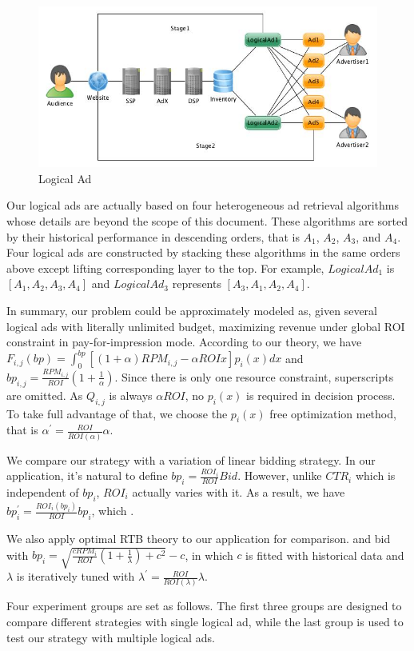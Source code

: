 \documentclass[sigconf]{acmart}
\newcommand{\sbp}{bp_{i,j}}
\newcommand{\sRPM}{RPM_{i,j}}
\newcommand{\sF}{F_{i,j}}
\newcommand{\ortbbp}{\sqrt{\frac{cRPM_i}{ROI}(1+\frac{1}{\lambda})+c^2}-c}
\newcommand{\dbbp}{\frac{\sRPM}{ROI}(1+\frac{1}{\alpha})}
\newcommand{\liniter}{bp_i^{'}=\frac{ROI_i(bp_i)}{ROI}bp_i}
\newcommand{\ortbiter}{\lambda^{'}=\frac{ROI}{ROI(\lambda)}\lambda}
\newcommand{\dbiter}{\alpha^{'} = \frac{ROI}{ROI(\alpha)}\alpha}
\begin{document}
\begin{figure}[!h]
\centering
\includegraphics[width=0.6\linewidth]{./LogicalAd.jpg}
\caption{Logical Ad}
\end{figure}

Our logical ads are actually based on four heterogeneous ad retrieval algorithms whose details are beyond the scope of this document.
These algorithms are sorted by their historical performance in descending orders, that is $A_1$, $A_2$, $A_3$, and $A_4$.
Four logical ads are constructed by stacking these algorithms in the same orders above except lifting corresponding layer to the top.
For example, $LogicalAd_1$ is $[A_1, A_2, A_3, A_4]$ and $LogicalAd_3$ represents $[A_3, A_1, A_2, A_4]$.

In summary, our problem could be approximately modeled as, given several logical ads with literally unlimited budget,
    maximizing revenue under global ROI constraint in pay-for-impression mode.
According to our theory, we have $\sF(bp) = \int_0^{bp} [(1+\alpha)\sRPM - \alpha{}ROIx]p_i(x)dx$
    and $\sbp=\dbbp$.
Since there is only one resource constraint, superscripts are omitted.
As $Q_{i,j}$ is always $\alpha{}ROI$, no $p_i(x)$ is required in decision process.
To take full advantage of that, we choose the $p_i(x)$ free optimization method,
    that is $\dbiter$.

We compare our strategy with a variation of linear bidding strategy.
In our application, it's natural to define $bp_i=\frac{ROI_i}{ROI}Bid$.
However, unlike $CTR_i$ which is independent of $bp_i$, $ROI_i$ actually varies with it.
As a result, we have $\liniter$,
    which .

We also apply optimal RTB theory to our application for comparison.
    and bid with $bp_i=\ortbbp$,
    in which $c$ is fitted with historical data
    and $\lambda$ is iteratively tuned with $\ortbiter$.

Four experiment groups are set as follows.
The first three groups are designed to compare different strategies with single logical ad,
    while the last group is used to test our strategy with multiple logical ads.
\end{document}
